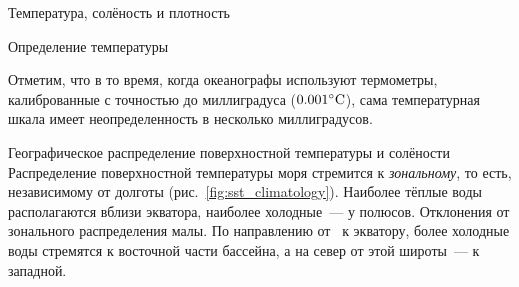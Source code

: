 \begin{chapter}{Температура, солёность и плотность}
\begin{section}{Определение температуры}

Отметим, что в то время, когда океанографы используют термометры, калиброванные 
с точностью до миллиградуса (${0.001}^\circ\mbox{C}$), сама температурная шкала 
имеет неопределенность в несколько миллиградусов.
%
\end{section}

\begin{section}{Географическое распределение поверхностной температуры и солёности}
Распределение поверхностной температуры моря стремится к \emph{зональному},
то есть, независимому от долготы (рис.~\ref{fig:sst_climatology}). 
Наиболее тёплые воды располагаются вблизи экватора, наиболее холодные~--- 
у полюсов. Отклонения от зонального распределения малы. 
По направлению от~ к экватору, более холодные воды стремятся 
к восточной части бассейна, а на север от этой широты~--- к западной.
%


\end{section}
\end{chapter}
